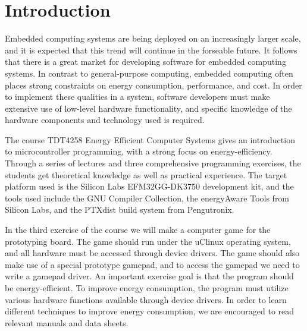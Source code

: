 \chapter{Introduction}

Embedded computing systems are being deployed on an increasingly larger scale, and it is expected that this trend will continue in the forseable future. It follows that there is a great market for developing software for embedded computing systems. In contrast to general-purpose computing, embedded computing often places strong constraints on energy consumption, performance, and cost. In order to implement these qualities in a system, software developers must make extensive use of low-level hardware functionality, and specific knowledge of the hardware components and technology used is required. 

The course TDT4258 Energy Efficient Computer Systems gives an introduction to microcontroller programming, with a strong focus on energy-efficiency. Through a series of lectures and three comprehensive programming exercises, the students get theoretical knowledge as well as practical experience.\cite{ntnu-web-tdt4258} The target platform used is the Silicon Labs EFM32GG-DK3750 development kit, and the tools used include the GNU Compiler Collection, the energyAware Tools from Silicon Labs, and the PTXdist build system from Pengutronix.

In the third exercise of the course we will make a computer game for the prototyping board. The game should run under the uClinux operating system, and all hardware must be accessed through device drivers. The game should also make use of a special prototype gamepad, and to access the gamepad we need to write a gamepad driver. An important exercise goal is that the program should be energy-efficient. To improve energy consumption, the program must utilize various hardware functions available through device drivers. In order to learn different techniques to improve energy consumption, we are encouraged to read relevant manuals and data sheets.\cite{compendium}

